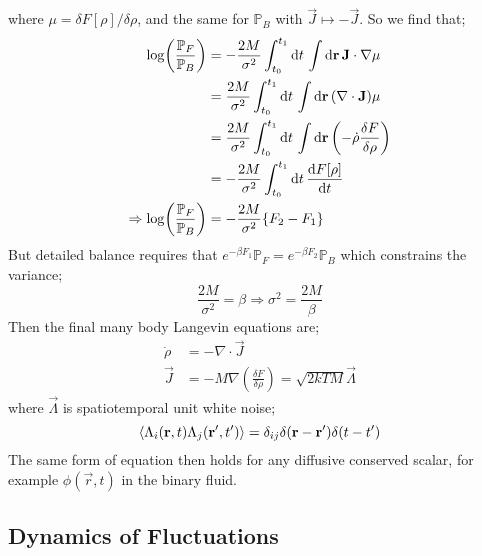 where $\mu = \delta F[\rho]/\delta \rho$, and the same for $\mathbb{P}_B$ with $\vec{J}\mapsto -\vec{J}$. So we find that;
\begin{align*}
\log\left(\frac{\mathbb{P}_F}{\mathbb{P}_B}\right) &= -\frac{2M}{\sigma^2}\int_{t_0}^{t_1}{\upd{t}\int{\upd{\vec{r}}\vec{J}\cdot\nabla\mu}} \\
&= \frac{2M}{\sigma^2}\int_{t_0}^{t_1}{\upd{t}\int{\upd{\vec{r}}(\nabla \cdot \vec{J})\mu}} \\
&= \frac{2M}{\sigma^2}\int_{t_0}^{t_1}{\upd{t}\int{\upd{\vec{r}}\left(-\dot{\rho}\frac{\delta F}{\delta \rho}\right)}} \\
&= -\frac{2M}{\sigma^2}\int_{t_0}^{t_1}{\upd{t}\frac{\ud F[\rho]}{\ud t}} \\
\Rightarrow \log\left(\frac{\mathbb{P}_F}{\mathbb{P}_B}\right) &= -\frac{2M}{\sigma^2}\set{F_2 - F_1}
\end{align*}
But detailed balance requires that $e^{-\beta F_1}\mathbb{P}_F = e^{-\beta F_2}\mathbb{P}_B$ which constrains the variance;
\begin{equation}
\frac{2M}{\sigma^2} = \beta \Rightarrow \sigma^2 = \frac{2M}{\beta}
\end{equation}
Then the final many body Langevin equations are;
\begin{align}
\dot{\rho} &= - \nabla \cdot \vec{J} \\
\vec{J} &= -M \nabla\left(\frac{\delta F}{\delta \rho}\right) = \sqrt{2kTM}\vec{\Lambda}
\end{align}
where $\vec{\Lambda}$ is spatiotemporal unit white noise;
\begin{equation*}
\left< \Lambda_i(\vec{r}, t) \Lambda_j(\vec{r}\pr, t\pr) \right> = \delta_{ij}\delta(\vec{r} - \vec{r}\pr)\delta(t - t\pr)
\end{equation*}
The same form of equation then holds for any diffusive conserved scalar, for example $\phi(\vec{r}, t)$ in the binary fluid.
\subsection{Dynamics of Fluctuations}
